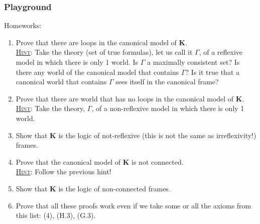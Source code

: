 \documentclass[xcolor=x11names]{beamer}
\newcommand{\dzsa}[1]{\textsc{\underline{#1}}:}
\begin{document}
\begin{frame}[t]
\frametitle{Playground}
\footnotesize

Homeworks:
\begin{enumerate}
\item Prove that there are loops in the canonical model of $\mathbf K$.
\\ {\tiny \dzsa{Hint} Take the theory (set of true formulas), let us call it $\Gamma$, of a reflexive model in which there is only 1 world. Is $\Gamma$ a maximally consistent set? Is there any world of the canonical model that contains $\Gamma$? Is it true that a canonical world that contains $\Gamma$ sees itself in the canonical frame?}
\item Prove that there are world that has no loops in the canonical model of $\mathbf K$.
\\ {\tiny \dzsa{Hint} Take the theory, $\Gamma$, of a non-reflexive model in which there is only 1 world.}
\item Show that $\mathbf K$ is the logic of not-reflexive (this is not the same as irreflexivity!) frames.
\item Prove that the canonical model of $\mathbf K$ is not connected.
\\ {\tiny \dzsa{Hint} Follow the previous hint!}
\item Show that $\mathbf K$ is the logic of non-connected frames.
\item Prove that all these proofs work even if we take some or all the axioms from this list: (4), (H.3), (G.3).
\end{enumerate}
\end{frame}
\end{document}
